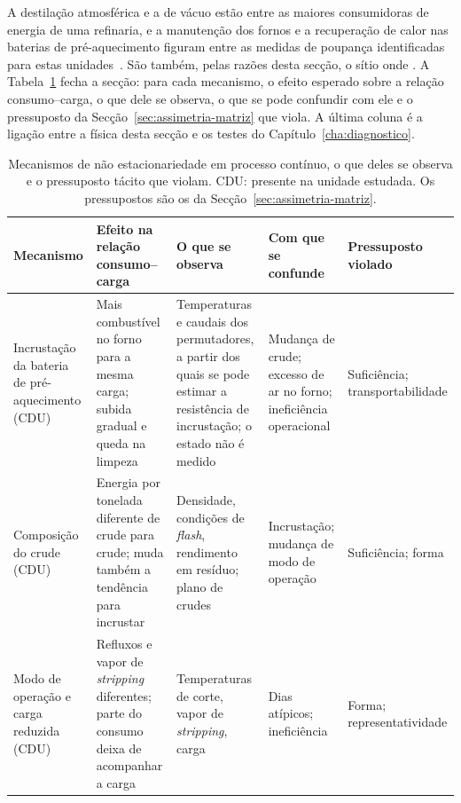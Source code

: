 A destilação atmosférica e a de vácuo estão entre as maiores consumidoras de
energia de uma refinaria, e a manutenção dos fornos e a recuperação de calor
nas baterias de pré-aquecimento figuram entre as medidas de poupança
identificadas para estas unidades~\cite{WorrellGalitsky2005}. São também, pelas razões desta secção, o sítio onde . A Tabela~\ref{tab:mecanismos-pressupostos} fecha a secção: para cada
mecanismo, o efeito esperado sobre a relação consumo--carga, o que dele se
observa, o que se pode confundir com ele e o pressuposto da
Secção~\ref{sec:assimetria-matriz} que viola. A última coluna é a ligação
entre a física desta secção e os testes do Capítulo~\ref{cha:diagnostico}.

\begin{table}[htbp]
  \centering\footnotesize
  \caption[Mecanismos de processo contínuo e pressupostos que violam]{Mecanismos
  de não estacionariedade em processo contínuo, o que deles se observa e o
  pressuposto tácito que violam. CDU: presente na unidade estudada. Os
  pressupostos são os da Secção~\ref{sec:assimetria-matriz}.}
  \label{tab:mecanismos-pressupostos}
  \begin{tabularx}{\textwidth}{@{}>{\raggedright\arraybackslash}p{2.3cm} >{\raggedright\arraybackslash}X >{\raggedright\arraybackslash}X >{\raggedright\arraybackslash}X >{\raggedright\arraybackslash}p{2.1cm}@{}}
    \toprule
    \textbf{Mecanismo} & \textbf{Efeito na relação consumo--carga} & \textbf{O que se observa} & \textbf{Com que se confunde} & \textbf{Pressuposto violado} \\
    \midrule
    Incrustação da bateria de pré-aquecimento (CDU) & Mais combustível no forno para a mesma carga; subida gradual e queda na limpeza & Temperaturas e caudais dos permutadores, a partir dos quais se pode estimar a resistência de incrustação; o estado não é medido & Mudança de crude; excesso de ar no forno; ineficiência operacional & Suficiência; transportabilidade \\
    \addlinespace
    Composição do crude (CDU) & Energia por tonelada diferente de crude para crude; muda também a tendência para incrustar & Densidade, condições de \emph{flash}, rendimento em resíduo; plano de crudes & Incrustação; mudança de modo de operação & Suficiência; forma \\
    \addlinespace
    Modo de operação e carga reduzida (CDU) & Refluxos e vapor de \emph{stripping} diferentes; parte do consumo deixa de acompanhar a carga & Temperaturas de corte, vapor de \emph{stripping}, carga & Dias atípicos; ineficiência & Forma; representatividade \\

\end{tabularx}
\end{table}
